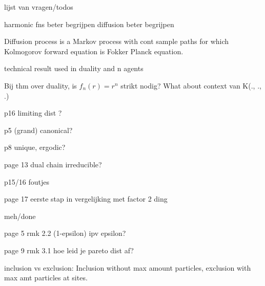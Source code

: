 lijst van vragen/todos

harmonic fns beter begrijpen
diffusion beter begrijpen

Diffusion process is a Markov process with cont sample paths for which Kolmogorov forward equation is Fokker Planck equation.


technical result used in duality and n agents

Bij thm over duality, is $f_n(r) = r^n$ strikt nodig? What about context van K(., ., .)

p16 limiting dist ?

p5 (grand) canonical?

p8 unique, ergodic?

page 13 dual chain irreducible?

p15/16 foutjes

page 17 eerste stap in vergelijking met factor 2 ding



meh/done

page 5 rmk 2.2 (1-epsilon) ipv epsilon?

page 9 rmk 3.1 hoe leid je pareto dist af?











inclusion vs exclusion: Inclusion without max amount particles, exclusion with max amt particles at sites.
